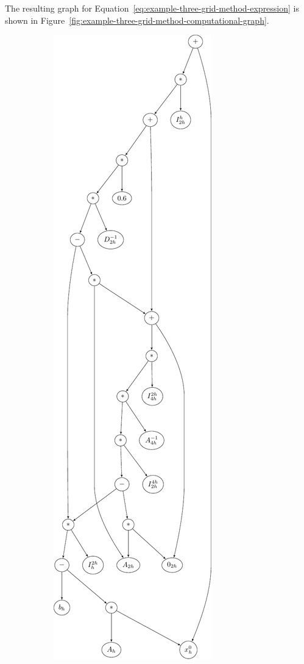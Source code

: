 The resulting graph for Equation~\eqref{eq:example-three-grid-method-expression} is shown in Figure~\ref{fig:example-three-grid-method-computational-graph}.
\begin{figure}
	\captionsetup{justification=centering}
	\begin{subfigure}[b]{0.49\textwidth}\centering
		\includegraphics[scale=0.5]{figures/trees/three_grid_method_computational_graph.pdf}

\end{subfigure}
\end{figure}
